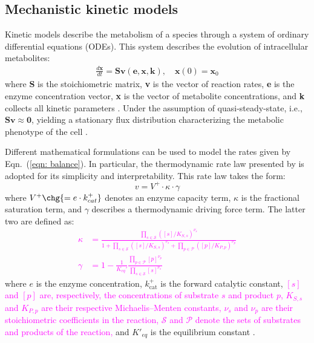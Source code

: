 \documentclass[conference]{IEEEtran}
\begin{document}
\subsection{Mechanistic kinetic models}

Kinetic models describe the metabolism of a species through a system of ordinary differential equations (ODEs). This system describes the evolution of intracellular metabolites:
\begin{align}
    \frac{d\mathbf{x}}{dt}= \mathbf{S} \mathbf{v}(\mathbf{e},\mathbf{x},\mathbf{k}), \quad  \mathbf{x}(0) = \mathbf{x}_0 \label{eqn: balance}
\end{align}
where \textbf{S} is the stoichiometric matrix, \textbf{v} is the vector of reaction rates, \textbf{e} is the enzyme concentration vector, \textbf{x} is the vector of metabolite concentrations, and \textbf{k} collects all kinetic parameters \cite{Saa2017}. Under the assumption of quasi-steady-state, i.e., $\mathbf{S} \mathbf{v} \approx \mathbf{0}$, yielding a stationary flux distribution characterizing the metabolic phenotype of the cell \cite{Orth2010a}.

Different mathematical formulations can be used to model the rates given by Eqn.~(\ref{eqn: balance}).
In particular, the thermodynamic rate law presented by \textcite{noor2013note} is adopted for its simplicity and interpretability. This rate law takes the form:
\begin{equation}
    v = V^+ \cdot \kappa \cdot \gamma
    \label{eqn:noor}
\end{equation}
where $V^+\chg{=e\cdot k_{cat}^+}$ denotes an enzyme capacity term, $\kappa$ is the fractional saturation term, and $\gamma$ describes a thermodynamic driving force term. The latter two are defined as:
\textcolor{magenta}{
\begin{align}
    \kappa &= \frac{\prod_{s\in \mathcal{S}} ([s]/K_{S,s})^{\nu_s}}{1 + \prod_{s\in \mathcal{S}} ([s]/K_{S,s})^{\nu_s} + \prod_{p\in\mathcal{P}} ([p]/K_{P,p})^{\nu_p}}
    \label{eqn:kappa}
    \\
    \gamma &= 1 - \frac{1}{K_{eq}'} \frac{\prod_{p\in\mathcal{P}} [p]^{\nu_p}}{\prod_{s\in\mathcal{S}} [s]^{\nu_s}}
    \label{eqn:gamma}
\end{align}
}
where $e$ is the enzyme concentration, $k^+_{\mathrm{cat}}$ is the forward
catalytic constant, \textcolor{magenta}{$[s]$ and $[p]$ are, respectively, the concentrations
of substrate $s$ and product $p$, $K_{S,s}$ and $K_{P,p}$ are their respective
Michaelis--Menten constants, $\nu_s$ and $\nu_p$ are their stoichiometric
coefficients in the reaction, $\mathcal{S}$ and $\mathcal{P}$ denote the sets of
substrates and products of the reaction,} and $K'_{eq}$ is the
equilibrium constant \cite{noor2013note}.
\end{document}
